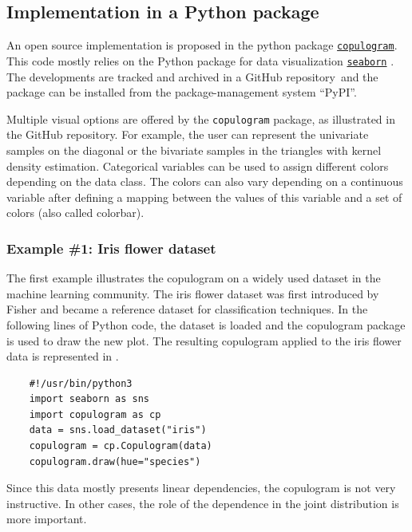 \subsection{Implementation in a Python package}

An open source implementation is proposed in the python package \href{https://github.com/efekhari27/copulogram}{\texttt{copulogram}}. 
This code mostly relies on the Python package for data visualization \href{https://seaborn.pydata.org/}{\texttt{seaborn}} \citep{waskom_2021_seaborn}. 
The developments are tracked and archived in a GitHub repository\footnotemark~and the package can be installed from the package-management system ``PyPI''. 

Multiple visual options are offered by the \texttt{copulogram} package, as illustrated in the GitHub repository. 
For example, the user can represent the univariate samples on the diagonal or the bivariate samples in the triangles with kernel density estimation.  
Categorical variables can be used to assign different colors depending on the data class. 
The colors can also vary depending on a continuous variable after defining a mapping between the values of this variable and a set of colors (also called colorbar).






\subsubsection{Example \#1: Iris flower dataset}

The first example illustrates the copulogram on a widely used dataset in the machine learning community. 
The iris flower dataset was first introduced by Fisher and became a reference dataset for classification techniques. 
In the following lines of Python code, the dataset is loaded and the copulogram package is used to draw the new plot. 
The resulting copulogram applied to the iris flower data is represented in . 
\lstset{style=mystyle, language=python}
%
\begin{lstlisting}
    #!/usr/bin/python3        
    import seaborn as sns
    import copulogram as cp
    data = sns.load_dataset("iris")
    copulogram = cp.Copulogram(data)
    copulogram.draw(hue="species")
\end{lstlisting}
%
Since this data mostly presents linear dependencies, the copulogram is not very instructive. 
In other cases, the role of the dependence in the joint distribution is more important.



